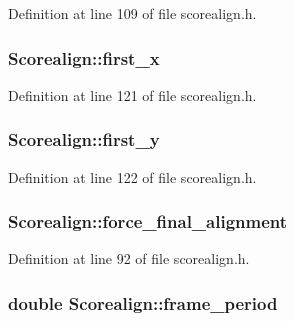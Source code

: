 Definition at line 109 of file scorealign.\+h.

\subsubsection[{\texorpdfstring{first\+\_\+x}{first_x}}]{ Scorealign\+::first\+\_\+x}\hypertarget{class_scorealign_ade0b85e4931d63e777ba81efc2cc44a8}{}\label{class_scorealign_ade0b85e4931d63e777ba81efc2cc44a8}


Definition at line 121 of file scorealign.\+h.

\subsubsection[{\texorpdfstring{first\+\_\+y}{first_y}}]{ Scorealign\+::first\+\_\+y}\hypertarget{class_scorealign_a9c7a049717992210177b363266a1bce5}{}\label{class_scorealign_a9c7a049717992210177b363266a1bce5}


Definition at line 122 of file scorealign.\+h.

\subsubsection[{\texorpdfstring{force\+\_\+final\+\_\+alignment}{force_final_alignment}}]{ Scorealign\+::force\+\_\+final\+\_\+alignment}\hypertarget{class_scorealign_a46b492352566a6b58134515e77b61801}{}\label{class_scorealign_a46b492352566a6b58134515e77b61801}


Definition at line 92 of file scorealign.\+h.

\subsubsection[{\texorpdfstring{frame\+\_\+period}{frame_period}}]{\setlength{\rightskip}{0pt plus 5cm}double Scorealign\+::frame\+\_\+period}\hypertarget{class_scorealign_a47f51125e3cb2018d1baa349be161be7}{}\label{class_scorealign_a47f51125e3cb2018d1baa349be161be7}


